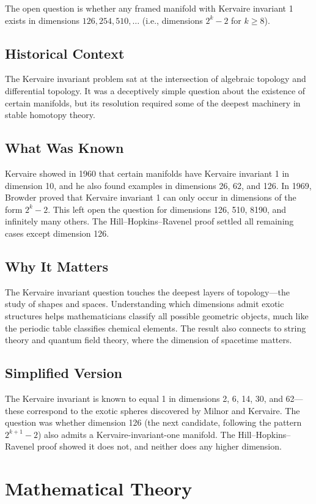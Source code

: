 The open question is whether any framed manifold with Kervaire invariant 1 exists in dimensions $126, 254, 510, \ldots$ (i.e., dimensions $2^k - 2$ for $k \geq 8$).

\subsection{Historical Context}
The Kervaire invariant problem sat at the intersection of algebraic topology and differential topology. It was a deceptively simple question about the existence of certain manifolds, but its resolution required some of the deepest machinery in stable homotopy theory.

\subsection{What Was Known}
Kervaire showed in 1960 that certain manifolds have Kervaire invariant 1 in dimension 10, and he also found examples in dimensions 26, 62, and 126. In 1969, Browder proved that Kervaire invariant 1 can only occur in dimensions of the form $2^k - 2$. This left open the question for dimensions 126, 510, 8190, and infinitely many others. The Hill--Hopkins--Ravenel proof settled all remaining cases except dimension 126.

\subsection{Why It Matters}
The Kervaire invariant question touches the deepest layers of topology---the study of shapes and spaces. Understanding which dimensions admit exotic structures helps mathematicians classify all possible geometric objects, much like the periodic table classifies chemical elements. The result also connects to string theory and quantum field theory, where the dimension of spacetime matters.

\subsection{Simplified Version}
The Kervaire invariant is known to equal 1 in dimensions 2, 6, 14, 30, and 62---these correspond to the exotic spheres discovered by Milnor and Kervaire. The question was whether dimension 126 (the next candidate, following the pattern $2^{k+1}-2$) also admits a Kervaire-invariant-one manifold. The Hill--Hopkins--Ravenel proof showed it does not, and neither does any higher dimension.

\section{Mathematical Theory}


